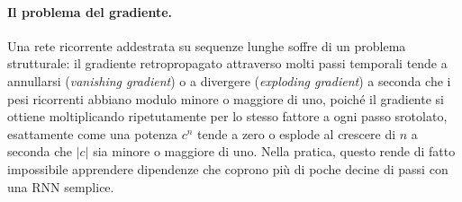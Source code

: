 \paragraph{Il problema del gradiente.} Una rete ricorrente addestrata su
sequenze lunghe soffre di un problema strutturale: il gradiente
retropropagato attraverso molti passi temporali tende a annullarsi
(\emph{vanishing gradient}) o a divergere (\emph{exploding gradient}) a
seconda che i pesi ricorrenti abbiano modulo minore o maggiore di uno,
poiché il gradiente si ottiene moltiplicando ripetutamente per lo stesso
fattore a ogni passo srotolato, esattamente come una potenza $c^n$ tende a
zero o esplode al crescere di $n$ a seconda che $|c|$ sia minore o
maggiore di uno. Nella pratica, questo rende di fatto impossibile
apprendere dipendenze che coprono più di poche decine di passi con una
RNN semplice.

